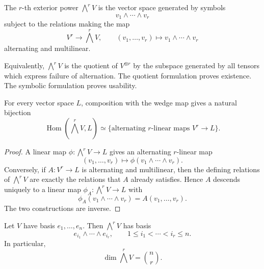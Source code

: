 \documentclass[11pt]{memoir}
\providecommand{\Hom}{\operatorname{Hom}}
\begin{document}
\begin{definition}
\label{def:exterior-power}
The \(r\)-th exterior power \(\bigwedge^rV\) is the vector space
generated by symbols
\[
  v_1\wedge\cdots\wedge v_r
\]
subject to the relations making the map
\[
  V^r\to \bigwedge^rV,\qquad
  (v_1,\dots,v_r)\mapsto v_1\wedge\cdots\wedge v_r
\]
alternating and multilinear.
\end{definition}

Equivalently, \(\bigwedge^rV\) is the quotient of \(V^{\otimes r}\)
by the subspace generated by all tensors which express failure of
alternation. The quotient formulation proves existence. The symbolic
formulation proves usability.

\begin{proposition}
\label{prop:exterior-universal}
For every vector space \(L\), composition with the wedge map gives a
natural bijection
\[
  \Hom\left(\bigwedge^rV,L\right)
  \simeq
  \{\text{alternating \(r\)-linear maps }V^r\to L\}.
\]
\end{proposition}

\begin{proof}
A linear map \(\phi:\bigwedge^rV\to L\) gives an alternating
\(r\)-linear map
\[
  (v_1,\dots,v_r)\mapsto \phi(v_1\wedge\cdots\wedge v_r).
\]
Conversely, if \(A:V^r\to L\) is alternating and multilinear, then
the defining relations of \(\bigwedge^rV\) are exactly the relations
that \(A\) already satisfies. Hence \(A\) descends uniquely to a
linear map \(\phi_A:\bigwedge^rV\to L\) with
\[
  \phi_A(v_1\wedge\cdots\wedge v_r)=A(v_1,\dots,v_r).
\]
The two constructions are inverse.
\end{proof}

\begin{proposition}
\label{prop:wedge-basis}
Let \(V\) have basis \(e_1,\dots,e_n\). Then \(\bigwedge^rV\) has
basis
\[
  e_{i_1}\wedge\cdots\wedge e_{i_r},
  \qquad
  1\leq i_1<\cdots<i_r\leq n.
\]
In particular,
\[
  \dim\bigwedge^rV=\binom nr.
\]
\end{proposition}
\end{document}
